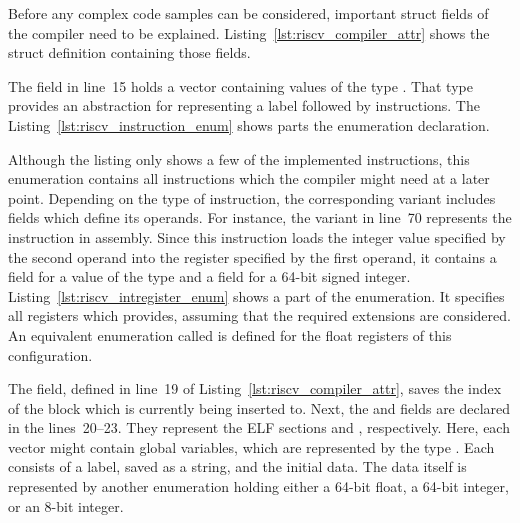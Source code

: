 Before any complex code samples can be considered, important struct fields of the compiler need to be explained.
Listing~\ref{lst:riscv_compiler_attr} shows the  struct definition containing those fields.


The  field in line~15 holds a vector containing values of the type .
That type provides an abstraction for representing a label followed by instructions.
The Listing~\ref{lst:riscv_instruction_enum} shows parts the  enumeration declaration.


Although the listing only shows a few of the implemented instructions,
this enumeration contains all instructions which the compiler might need at a later point.
Depending on the type of instruction, the corresponding variant includes fields which define its operands.
For instance, the  variant in line~70 represents the  instruction in assembly.
Since this instruction loads the integer value specified by the second operand into the register specified by the first operand,
it contains a field for a value of the type  and a field for a 64-bit signed integer.
Listing~\ref{lst:riscv_intregister_enum} shows a part of the  enumeration.
It specifies all registers which \riscv{} provides, assuming that the required extensions are considered.
An equivalent enumeration called  is defined for the float registers of this \riscv{} configuration.


The  field, defined in line~19 of Listing~\ref{lst:riscv_compiler_attr},
saves the index of the block which is currently being inserted to.
Next, the  and  fields are declared in the lines~20--23.
They represent the ELF sections  and , respectively.
Here, each vector might contain global variables, which are represented by the type .
Each  consists of a label, saved as a string, and the initial data.
The data itself is represented by another enumeration holding either a 64-bit float, a 64-bit integer, or an 8-bit integer.

